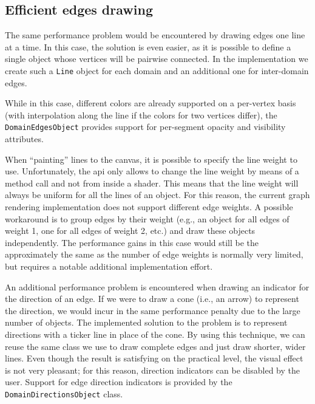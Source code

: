 \subsection{Efficient edges drawing}

The same performance problem would be encountered by drawing edges one line at a time. In this case, the solution is even easier, as it is possible to define a single object whose vertices will be pairwise connected. In the implementation we create such a \texttt{Line} object for each domain and an additional one for inter-domain edges.

While in this case, different colors are already supported on a per-vertex basis (with interpolation along the line if the colors for two vertices differ), the \texttt{DomainEdgesObject} provides support for per-segment opacity and visibility attributes.

When ``painting'' lines to the canvas, it is possible to specify the line weight to use. Unfortunately, the \gls{api} only allows to change the line weight by means of a method call and not from inside a shader. This means that the line weight will always be uniform for all the lines of an object. For this reason, the current graph rendering implementation does not support different edge weights. A possible workaround is to group edges by their weight (e.g., an object for all edges of weight 1, one for all edges of weight 2, etc.) and draw these objects independently. The performance gains in this case would still be the approximately the same as the number of edge weights is normally very limited, but requires a notable additional implementation effort.

An additional performance problem is encountered when drawing an indicator for the direction of an edge. If we were to draw a cone (i.e., an arrow) to represent the direction, we would incur in the same performance penalty due to the large number of objects. The implemented solution to the problem is to represent directions with a ticker line in place of the cone. By using this technique, we can reuse the same class we use to draw complete edges and just draw shorter, wider lines. Even though the result is satisfying on the practical level, the visual effect is not very pleasant; for this reason, direction indicators can be disabled by the user. Support for edge direction indicators is provided by the \texttt{DomainDirectionsObject} class.

